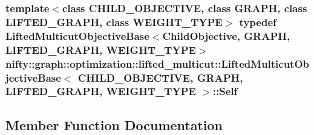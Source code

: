 \subsubsection[{Self}]{\setlength{\rightskip}{0pt plus 5cm}template$<$class C\+H\+I\+L\+D\+\_\+\+O\+B\+J\+E\+C\+T\+I\+V\+E, class G\+R\+A\+P\+H, class L\+I\+F\+T\+E\+D\+\_\+\+G\+R\+A\+P\+H, class W\+E\+I\+G\+H\+T\+\_\+\+T\+Y\+P\+E$>$ typedef {\bf Lifted\+Multicut\+Objective\+Base}$<${\bf Child\+Objective}, G\+R\+A\+P\+H, L\+I\+F\+T\+E\+D\+\_\+\+G\+R\+A\+P\+H, W\+E\+I\+G\+H\+T\+\_\+\+T\+Y\+P\+E$>$ {\bf nifty\+::graph\+::optimization\+::lifted\+\_\+multicut\+::\+Lifted\+Multicut\+Objective\+Base}$<$ C\+H\+I\+L\+D\+\_\+\+O\+B\+J\+E\+C\+T\+I\+V\+E, G\+R\+A\+P\+H, L\+I\+F\+T\+E\+D\+\_\+\+G\+R\+A\+P\+H, W\+E\+I\+G\+H\+T\+\_\+\+T\+Y\+P\+E $>$\+::{\bf Self}}\label{classnifty_1_1graph_1_1optimization_1_1lifted__multicut_1_1LiftedMulticutObjectiveBase_a103f0e557ebe2c8f86c07ee1a7aeeb5b}


\subsection{Member Function Documentation}
\hypertarget{classnifty_1_1graph_1_1optimization_1_1lifted__multicut_1_1LiftedMulticutObjectiveBase_a249168f5d345535e4d49abb775b5f4ee}{}
